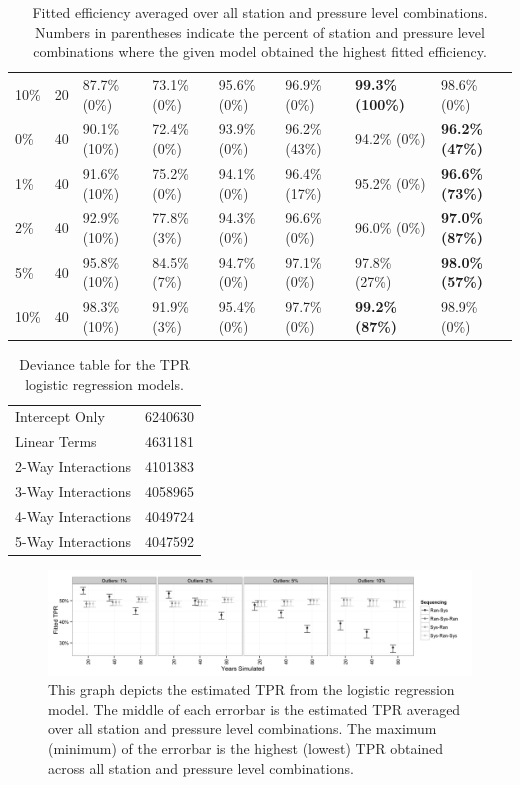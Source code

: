 \documentclass[12pt]{article}
\begin{document}
\begin{table}[ht]
\begin{tabular}{lrllllll}
  10\% &  20 & 87.7\% (0\%) & 73.1\% (0\%) & 95.6\% (0\%) & 96.9\% (0\%) & \textbf{99.3\% (100\%)} & 98.6\% (0\%) \\ 
  0\% &  40 & 90.1\% (10\%) & 72.4\% (0\%) & 93.9\% (0\%) & 96.2\% (43\%) & 94.2\% (0\%) & \textbf{96.2\% (47\%)} \\ 
  1\% &  40 & 91.6\% (10\%) & 75.2\% (0\%) & 94.1\% (0\%) & 96.4\% (17\%) & 95.2\% (0\%) & \textbf{96.6\% (73\%)} \\ 
  2\% &  40 & 92.9\% (10\%) & 77.8\% (3\%) & 94.3\% (0\%) & 96.6\% (0\%) & 96.0\% (0\%) & \textbf{97.0\% (87\%)} \\ 
  5\% &  40 & 95.8\% (10\%) & 84.5\% (7\%) & 94.7\% (0\%) & 97.1\% (0\%) & 97.8\% (27\%) & \textbf{98.0\% (57\%)} \\ 
  10\% &  40 & 98.3\% (10\%) & 91.9\% (3\%) & 95.4\% (0\%) & 97.7\% (0\%) & \textbf{99.2\% (87\%)} & 98.9\% (0\%) \\ 
\hline
\end{tabular}
\caption{Fitted efficiency averaged over all station and pressure level combinations.  Numbers in parentheses indicate the percent of station and pressure level combinations where the given model obtained the highest fitted efficiency.}
\label{tab:homOrd}
\end{table}

\begin{table}[ht]
	\centering
	\begin{tabular}{|ll|}
  		\hline
		Intercept Only & 6240630 \\ 
 		 Linear Terms & 4631181 \\ 
 		 2-Way Interactions & 4101383 \\ 
 		 3-Way Interactions & 4058965 \\ 
 		 4-Way Interactions & 4049724 \\ 
 	 	5-Way Interactions & 4047592 \\ 
   		\hline
	\end{tabular}
	\caption{Deviance table for the TPR logistic regression models.}
	\label{tab:devTPR}
\end{table}

\begin{figure}[h!]
	\centering
	\includegraphics[width=\textwidth]{TPR_Order_Plot_BW}
	\caption{This graph depicts the estimated TPR from the logistic regression model.  The middle of each errorbar is the estimated TPR averaged over all station and pressure level combinations.  The maximum (minimum) of the errorbar is the highest (lowest) TPR obtained across all station and pressure level combinations.}
	\label{fig:fitTPR}
\end{figure}
\end{document}
